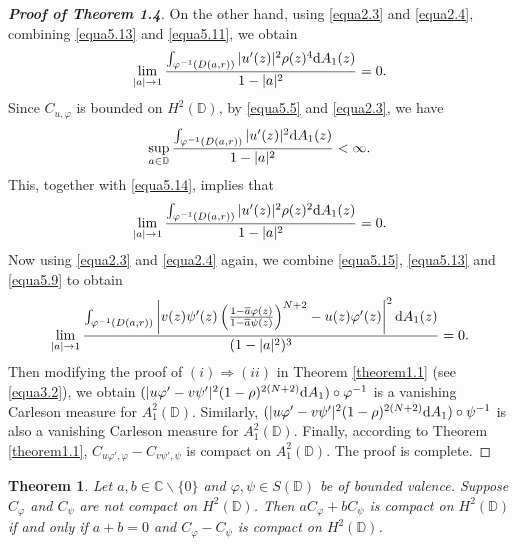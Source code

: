 \documentclass[preprint,12pt,times]{elsarticle}
\newtheorem{theorem}{Theorem}[section]
\theoremstyle{definition}
\theoremstyle{remark}
\numberwithin{equation}{section}
\begin{document}
\begin{proof}[{\bf Proof of Theorem 1.4}]
On the other hand, using \eqref{equa2.3} and \eqref{equa2.4}, combining \eqref{equa5.13} and \eqref{equa5.11}, we obtain
\begin{align}\label{equa5.14}
\lim_{|a|\to 1}\frac{\int_{\varphi^{-1}(D(a,r))}|u'(z)|^2\rho(z)^4{\rm d}A_1(z)}{1-|a|^2}=0.
\end{align}
Since $C_{u,\varphi}$ is bounded on $H^2(\mathbb{D})$, by \eqref{equa5.5} and \eqref{equa2.3}, we have
\begin{align*}
\sup_{a\in\mathbb{D}}\frac{\int_{\varphi^{-1}(D(a,r))}|u'(z)|^2{\rm d}A_1(z)}{1-|a|^2}<\infty.
\end{align*}
This, together with \eqref{equa5.14}, implies that
\begin{align}\label{equa5.15}
\lim_{|a|\to 1}\frac{\int_{\varphi^{-1}(D(a,r))}|u'(z)|^2\rho(z)^2{\rm d}A_1(z)}{1-|a|^2}=0.
\end{align}
Now using \eqref{equa2.3} and \eqref{equa2.4} again, we combine \eqref{equa5.15}, \eqref{equa5.13} and \eqref{equa5.9} to obtain
\begin{align*}
\lim_{|a|\to 1}\frac{\int_{\varphi^{-1}(D(a,r))}\left|v(z)\psi'(z)\left(\frac{1-\overline{a}\varphi(z)}{1-\overline{a}\psi(z)}\right)^{N+2}-u(z)\varphi'(z)\right|^2{\rm d}A_1(z)}{(1-|a|^2)^3}=0.
\end{align*}
Then modifying the proof of $(i)\Rightarrow(ii)$ in Theorem \ref{theorem1.1} (see \eqref{equa3.2}), we obtain $(|u\varphi'-v\psi'|^2(1-\rho)^{2(N+2)}{\rm d}A_1)\circ\varphi^{-1}$ is a vanishing Carleson measure for $A_1^2(\mathbb{D})$. Similarly, $(|u\varphi'-v\psi'|^2(1-\rho)^{2(N+2)}{\rm d}A_1)\circ\psi^{-1}$ is also a vanishing Carleson measure for $A_1^2(\mathbb{D})$. Finally, according to Theorem \ref{theorem1.1}, $C_{u\varphi',\varphi}-C_{v\psi',\psi}$ is compact on $A_1^2(\mathbb{D})$. The proof is complete.
\end{proof}


\begin{theorem}\label{theorem5.2}
Let $a,b\in \mathbb{C}\backslash\{0\}$ and $\varphi,\psi\in S(\mathbb{D})$ be of bounded valence. Suppose $C_{\varphi}$ and $C_{\psi}$ are not compact on $H^2(\mathbb{D})$. Then $aC_{\varphi}+bC_{\psi}$ is compact on $H^2(\mathbb{D})$ if and only if $a+b=0$ and $C_{\varphi}-C_{\psi}$ is compact on $H^2(\mathbb{D})$.
\end{theorem}
\end{document}
